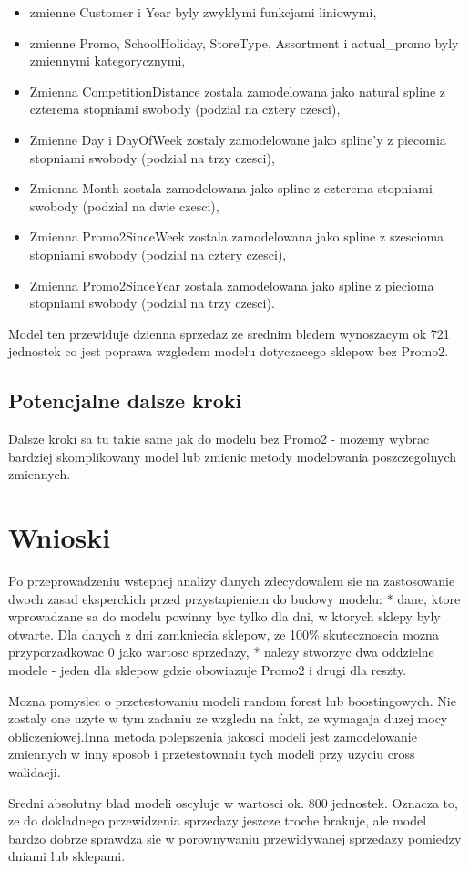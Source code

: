 \documentclass[]{article}
\providecommand{\tightlist}{%
  \setlength{\itemsep}{0pt}\setlength{\parskip}{0pt}}
\begin{document}
\begin{itemize}
\tightlist
\item
  zmienne Customer i Year byly zwyklymi funkcjami liniowymi,
\item
  zmienne Promo, SchoolHoliday, StoreType, Assortment i actual\_promo
  byly zmiennymi kategorycznymi,
\item
  Zmienna CompetitionDistance zostala zamodelowana jako natural spline z
  czterema stopniami swobody (podzial na cztery czesci),
\item
  Zmienne Day i DayOfWeek zostaly zamodelowane jako spline'y z piecomia
  stopniami swobody (podzial na trzy czesci),
\item
  Zmienna Month zostala zamodelowana jako spline z czterema stopniami
  swobody (podzial na dwie czesci),
\item
  Zmienna Promo2SinceWeek zostala zamodelowana jako spline z szescioma
  stopniami swobody (podzial na cztery czesci),
\item
  Zmienna Promo2SinceYear zostala zamodelowana jako spline z piecioma
  stopniami swobody (podzial na trzy czesci).
\end{itemize}

Model ten przewiduje dzienna sprzedaz ze srednim bledem wynoszacym ok
721 jednostek co jest poprawa wzgledem modelu dotyczacego sklepow bez
Promo2.

\hypertarget{potencjalne-dalsze-kroki-1}{%
\subsection{Potencjalne dalsze kroki}\label{potencjalne-dalsze-kroki-1}}

Dalsze kroki sa tu takie same jak do modelu bez Promo2 - mozemy wybrac
bardziej skomplikowany model lub zmienic metody modelowania
poszczegolnych zmiennych.

\hypertarget{wnioski}{%
\section{Wnioski}\label{wnioski}}

Po przeprowadzeniu wstepnej analizy danych zdecydowalem sie na
zastosowanie dwoch zasad eksperckich przed przystapieniem do budowy
modelu: * dane, ktore wprowadzane sa do modelu powinny byc tylko dla
dni, w ktorych sklepy byly otwarte. Dla danych z dni zamkniecia sklepow,
ze 100\% skutecznoscia mozna przyporzadkowac 0 jako wartosc sprzedazy, *
nalezy stworzyc dwa oddzielne modele - jeden dla sklepow gdzie
obowiazuje Promo2 i drugi dla reszty.

Mozna pomyslec o przetestowaniu modeli random forest lub boostingowych.
Nie zostaly one uzyte w tym zadaniu ze wzgledu na fakt, ze wymagaja
duzej mocy obliczeniowej.Inna metoda polepszenia jakosci modeli jest
zamodelowanie zmiennych w inny sposob i przetestownaiu tych modeli przy
uzyciu cross walidacji.

Sredni absolutny blad modeli oscyluje w wartosci ok. 800 jednostek.
Oznacza to, ze do dokladnego przewidzenia sprzedazy jeszcze troche
brakuje, ale model bardzo dobrze sprawdza sie w porownywaniu
przewidywanej sprzedazy pomiedzy dniami lub sklepami.
\end{document}
